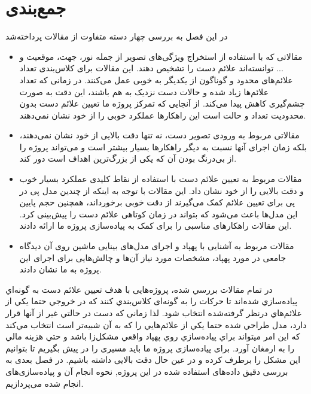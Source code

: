 \section{جمع‌بندی}

در این فصل به بررسی چهار دسته متفاوت از مقالات پرداخته‌شد 
\begin{itemize}
    \item مقالاتی که با استفاده از استخراج ویژگی‌های تصویر از جمله نور، جهت، موقعیت و ... توانسته‌اند علائم دست را تشخیص دهند. این مقالات برای کلاس‌بندی تعداد علائم‌های محدود و گوناگون از یکدیگر به خوبی عمل می‌کنند. در زمانی که تعداد علائم‌ها زیاد شده و حالات دست نزدیک به هم باشند، این دقت به صورت چشم‌گیری کاهش پیدا می‌کند. از آنجایی که تمرکز پروژه ما تعیین علائم دست بدون محدودیت تعداد و حالت است این راهکار‌ها عملکرد خوبی را از خود نشان نمی‌دهند.
    \item مقالاتی مربوط به ورودی تصویر دست، نه تنها دقت بالایی از خود نشان نمی‌دهند، بلکه زمان اجرای آنها نسبت به دیگر راهکارها بسیار بیشتر است و می‌تواند پروژه را از بی‌درنگ بودن آن که یکی از بزرگ‌ترین اهداف است دور کند.
    \item مقالات مربوط به تعیین علائم دست با استفاده از نقاط کلیدی عملکرد بسیار خوب و دقت بالایی را از خود نشان داد. این مقالات با توجه به اینکه از چندین مدل پی در پی برای تعیین علائم کمک می‌گیرند از دقت خوبی برخورداند، همچنین حجم پایین این مدل‌ها باعث می‌شود که بتواند در زمان کوتاهی علائم دست را پیش‌بینی کرد. این مقالات راهکار‌های مناسبی را برای کمک به پیاده‌سازی پروژه ما ارائه دادند.
    \item مقالات مربوط به آشنایی با پهپاد و اجرای مدل‌های بینایی ماشین روی آن دیدگاه جامعی در مورد پهپاد، مشخصات مورد نیاز آن‌ها و چالش‌هایی برای اجرای این پروژه به ما نشان دادند.
\end{itemize}

در تمام مقالات بررسي شده، پروژه‌هایی با هدف تعیین علائم دست به گونه‌اي پياده‌سازي شده‌اند تا حركات را به گونه‌ای كلاس‌بندي كنند كه در خروجي حتما يكي از علائم‌هاي درنظر گرفته‌شده انتخاب شود. لذا زماني كه دست در حالتي غير از آنها قرار دارد، مدل طراحي شده 
حتما يكي از علائم‌هايي را كه به آن شبيه‌تر است انتخاب مي‌كند كه اين امر ميتواند براي پياده‌سازي روي پهپاد واقعي مشكل‌زا باشد و حتي هزينه مالي را به ارمغان آورد. برای پیاده‌سازی پروژه ما باید مسیری را در پیش بگیریم تا بتوانیم این مشکل را برطرف کرده و در عین حال دقت بالایی داشته باشیم.
در فصل بعدی به بررسی دقیق داده‌های استفاده شده در این پروژه‌‌‌, نحوه انجام آن و پیاده‌سازی‌های انجام شده می‌پردازیم.

